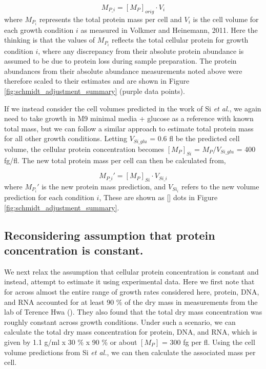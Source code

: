 \begin{equation}
	M_{P\_i} = [M_P]_{orig} \cdot V_{i}
\end{equation}
where $M_{P_i}$ represents the total protein mass per cell and $V_{i}$ is the
cell volume for each growth condition $i$ as measured in Volkmer and Heinemann,
2011. Here the thinking is that the values of $M_{P_i}$ reflects the total
cellular protein for growth condition $i$, where any discrepancy from their
absolute protein abundance is assumed to be due to protein loss during sample
preparation. The protein abundances from their absolute abundance measurements
noted above were therefore scaled to their estimates and are  shown in Figure
\ref{fig:schmidt_adjustment_summary} (purple data points).



If we instead consider the cell volumes predicted in the work of Si \textit{et al.},
we again need to take growth in M9 minimal media + glucose as a reference with known total mass,
but we can follow a similar approach to estimate total protein mass for all other growth conditions.
Letting  $V_{Si\_glu}$ = 0.6 fl be the predicted cell volume, the
cellular protein concentration becomes $[M_P]_{Si}$ = $M_P/V_{Si\_glu}$ = 400 fg/fl. The
new total protein mass per cell can then be calculated from,

\begin{equation}
	M_{P\_i}' = [M_P]_{Si} \cdot V_{Si\_i}
\end{equation}
where $M_{P_i}'$ is the new protein mass prediction, and $V_{Si_i}$ refers to the new volume prediction for each condition $i$,
These are shown as [] dots in Figure \ref{fig:schmidt_adjustment_summary}.


\subsection{Reconsidering assumption that protein concentration is constant.}

We next relax the assumption that cellular protein concentration is constant and
instead, attempt to  estimate it using experimental data. Here we first note
that  for across almost the entire range of growth rates considered here,
protein, DNA, and RNA accounted for at least 90 \% of the dry mass in
measurements from the lab of Terence Hwa (\cite{basan2015}). They also found that
the total dry mass concentration was roughly constant across growth conditions.
Under such a scenario, we can calculate the total dry mass concentration for
protein, DNA, and RNA, which is given by 1.1 g/ml x 30 \% x 90 \% or about
$[M_P]$ = 300 fg per fl. Using the cell volume predictions from Si \textit{et
al.}, we can then calculate the associated mass per cell.

